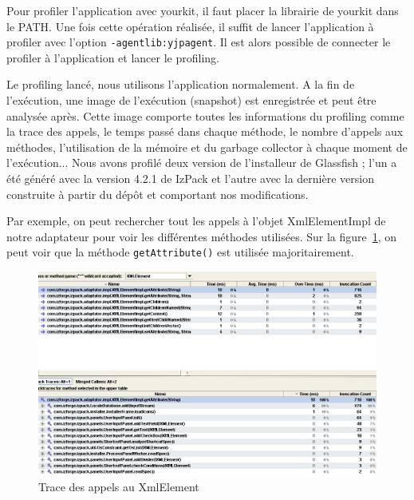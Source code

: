 Pour profiler l'application avec yourkit, il faut placer la librairie de yourkit dans le PATH. 
Une fois cette opération réalisée, il suffit de lancer l'application à profiler avec l'option \verb|-agentlib:yjpagent|.
Il est alors possible de connecter le profiler à l'application et lancer le profiling.

Le profiling lancé, nous utilisons l'application normalement.
A la fin de l'exécution, une image de l'exécution (snapshot) est enregistrée et peut être analysée après.
Cette image comporte toutes les informations du profiling comme la trace des appels, le temps passé dans chaque méthode, le nombre d'appels aux méthodes, l'utilisation de la mémoire et du garbage collector à chaque moment de l'exécution...
Nous avons profilé deux version de l'installeur de Glassfish ; l'un a été généré avec la version 4.2.1 de IzPack et l'autre avec la dernière version construite à partir du dépôt et comportant nos modifications.

Par exemple, on peut rechercher tout les appels à l'objet XmlElementImpl de notre adaptateur pour voir les différentes méthodes utilisées. Sur la figure~\ref{fig:yourkitXmlElement}, on peut voir que la méthode \verb|getAttribute()| est utilisée majoritairement.
\begin{figure}[H]
	\centering
	\includegraphics[width=1\textwidth]{../image/yourkitXmlElement.png}
	\caption{Trace des appels au XmlElement}
	\label{fig:yourkitXmlElement}
\end{figure}

